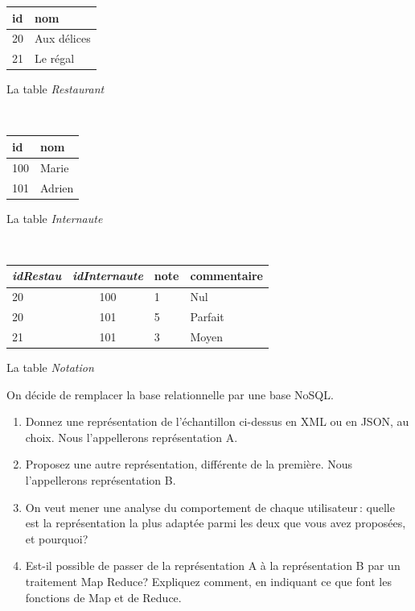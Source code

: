 \documentclass[10pt,a4paper]{article}
\newcommand{\cle}[1]{\textbf{#1}}
\def\fk#1{\textit{#1}}
\def\tble#1{\textit{#1}}
\begin{document}
\vspace*{0.2cm}
\begin{minipage}[b]{2.5cm}
\begin{tabular}{l|l}
\cle{id} & nom\\
\hline
20 & Aux délices \\
21 & Le régal \\
\hline
\end{tabular}

\centerline{La table \tble{Restaurant}}
\end{minipage} \hspace*{0.5cm} \
\begin{minipage}[b]{3cm}
\begin{tabular}{l|l}
\cle{id} &  nom  \\
\hline
100 & Marie \\
101 & Adrien \\
\hline
\end{tabular}

\centerline{La table \tble{Internaute}}
\end{minipage} \hspace*{0.3cm} \
\begin{minipage}[b]{3cm}
\begin{tabular}{l|c|l|l}
\cle{\fk{idRestau}} & \cle{\fk{idInternaute}}  & note & commentaire \\
\hline
20  & 100  & 1 & Nul\\
20 & 101  & 5 & Parfait\\
21 & 101  & 3 & Moyen\\
\hline
\end{tabular}

\centerline{La table \tble{Notation}}
\end{minipage}

\vspace*{0.2cm}
On décide de remplacer la base relationnelle par une base NoSQL.

\begin{enumerate}
  \item Donnez une représentation de l'échantillon ci-dessus en XML ou en JSON, au choix.
      Nous l'appellerons représentation A.
  \item Proposez une autre représentation, différente de la première.  Nous l'appellerons représentation B.
  \item On veut mener une analyse du comportement de chaque utilisateur\,: quelle
       est la représentation la plus adaptée parmi les deux que vous avez proposées,
        et pourquoi?
     \item Est-il possible de passer de la représentation A à la représentation B par un traitement
        Map Reduce? Expliquez comment, en indiquant ce que font les fonctions de Map et de Reduce.
\end{enumerate}
\end{document}
